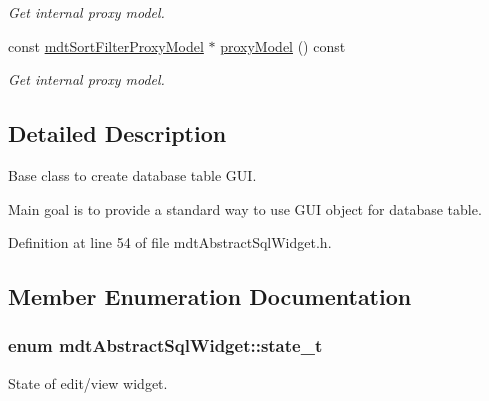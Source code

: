 \begin{DoxyCompactItemize}
\begin{DoxyCompactList}\small\item\em Get internal proxy model. \end{DoxyCompactList}\item 
const \hyperlink{classmdt_sort_filter_proxy_model}{mdt\-Sort\-Filter\-Proxy\-Model} $\ast$ \hyperlink{classmdt_abstract_sql_widget_ac3b54b54289e7366c5fa80091c0d48b4}{proxy\-Model} () const 
\begin{DoxyCompactList}\small\item\em Get internal proxy model. \end{DoxyCompactList}\end{DoxyCompactItemize}


\subsection{Detailed Description}
Base class to create database table G\-U\-I. 

Main goal is to provide a standard way to use G\-U\-I object for database table. 

Definition at line 54 of file mdt\-Abstract\-Sql\-Widget.\-h.



\subsection{Member Enumeration Documentation}
\hypertarget{classmdt_abstract_sql_widget_a54e6a7f2b41fb3edfa1e4ed62abf4072}{
\subsubsection[{state\-\_\-t}]{\setlength{\rightskip}{0pt plus 5cm}enum {\bf mdt\-Abstract\-Sql\-Widget\-::state\-\_\-t}}}\label{classmdt_abstract_sql_widget_a54e6a7f2b41fb3edfa1e4ed62abf4072}


State of edit/view widget. 

